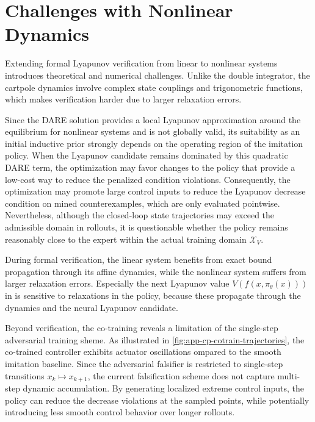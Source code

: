 \section{Challenges with Nonlinear Dynamics}
\label{sec:discussion-challenges}

Extending formal Lyapunov verification from linear to nonlinear systems introduces theoretical and numerical challenges. 
Unlike the double integrator, the cartpole dynamics involve complex state couplings and trigonometric functions, 
which makes verification harder due to larger relaxation errors. 

Since the DARE solution provides a local Lyapunov approximation around the equilibrium for nonlinear systems and is not globally valid, 
its suitability as an initial inductive prior strongly depends on the operating region of the imitation policy. 
When the Lyapunov candidate remains dominated by this quadratic DARE term, the optimization may favor changes to 
the policy that provide a low-cost way to reduce the penalized condition violations. 
Consequently, the optimization may promote large control inputs to reduce 
the Lyapunov decrease condition on mined counterexamples, which are only evaluated pointwise. 
Nevertheless, although the closed-loop state trajectories may exceed the admissible domain in rollouts, 
it is questionable whether the policy remains reasonably close to the expert within the actual training domain $\mathcal{X}_V$.

During formal verification, the linear system benefits from exact bound propagation through its affine dynamics, 
while the nonlinear system suffers from larger relaxation errors. 
Especially the next Lyapunov value $V(f(x,\pi_\theta(x)))$ in  is sensitive to relaxations 
in the policy, because these propagate through the dynamics and the neural Lyapunov candidate. 

Beyond verification, the co-training reveals a limitation of the single-step adversarial training sheme. 
As illustrated in \cref{fig:app-cp-cotrain-trajectories}, the co-trained controller exhibits actuator oscillations 
ompared to the smooth imitation baseline. 
Since the adversarial falsifier is restricted to single-step transitions $x_k \mapsto x_{k+1}$, 
the current falsification scheme does not capture multi-step dynamic accumulation.
By generating localized extreme control inputs, the policy can reduce the decrease violations 
at the sampled points, while potentially introducing less smooth control behavior over longer rollouts.